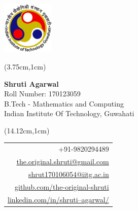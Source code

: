\documentclass[a4paper,10pt]{report}
\begin{document}

\begin{minipage}[t]{0.3\textwidth}
\hspace{-15pt}
\includegraphics[width=2.5cm,clip]{iitg_logo.jpg}
\end{minipage}
\begin{textblock*}{30cm}(3.75cm,1cm)
    \begin{minipage}[t]{0.3\textwidth}
    \textbf{\huge Shruti Agarwal} \\
    {Roll Number: 170123059} \\
    {B.Tech - Mathematics and Computing} \\
    {Indian Institute Of Technology, Guwahati}
    \end{minipage}
\end{textblock*}

\begin{textblock*}{30cm}(14.12cm,1cm)
    \begin{minipage}[t]{0.3\textwidth}
        \begin{tabular}[t]{@{} r}
        +91-9820294489 \\
        \href{mailto:the.original.shruti@gmail.com}{the.original.shruti@gmail.com}\\
        \href{mailto:shrut170106054@iitg.ac.in}{shrut170106054@iitg.ac.in}\\
        \href{https://github.com/the-original-shruti}{github.com/the-original-shruti}\\
        \href{https://linkedin.com/in/shruti--agarwal/}{linkedin.com/in/shruti--agarwal/}\\
        \end{tabular}
    \end{minipage}
\end{textblock*}


\vspace{-4pt}
\end{document}

